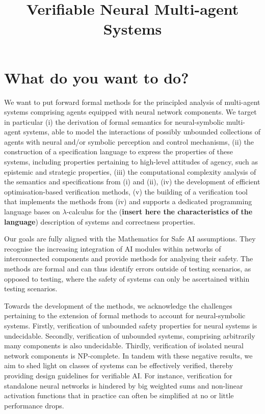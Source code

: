\documentclass{article}[11pt]
\title{Verifiable Neural Multi-agent Systems}
\date{}
\begin{document}
\maketitle

\section{What do you want to do?}


We want to put forward formal methods for the principled
analysis of multi-agent systems comprising agents equipped
with neural network components. We target in particular (i)
the derivation of formal semantics for neural-symbolic
multi-agent systems, able to model the interactions of
possibly unbounded collections of agents with neural and/or
symbolic perception and control mechanisms, (ii) the
construction of a specification language to express the
properties of these systems, including properties pertaining
to high-level attitudes of agency, such as epistemic and
strategic properties, (iii) the computational complexity
analysis of the semantics and specifications from (i) and
(ii), (iv) the development of efficient
optimisation-based verification methods, (v) the building of
a verification tool that implements the methods from (iv)
and supports a dedicated programming language bases on
$\lambda$-calculus for the ({\bf insert here the
characteristics of the language}) description of systems and
correctness properties.

Our goals are fully aligned with the Mathematics for Safe AI
assumptions.  They recognise the increasing integration of
AI modules within networks of interconnected components and
provide methods for analysing their safety.  The methods are
formal and  can thus identify errors outside of testing
scenarios, as opposed to testing, where the safety of
systems can only be ascertained within testing scenarios.

Towards the development of the methods, we acknowledge the
challenges pertaining to the extension of formal methods to account
for neural-symbolic systems. Firstly, verification of
unbounded safety properties for neural systems is
undecidable. Secondly, verification of unbounded systems,
comprising arbitrarily many components is also undecidable.
Thirdly, verification of isolated neural network components
is NP-complete. In tandem with these negative results, we
aim to shed light on classes of systems can be effectively
verified, thereby providing design guidelines for verifiable
AI. For instance, verification for standalone neural
networks is hindered by big weighted sums and non-linear
activation functions that in practice can often be
simplified at no or little performance drops. 
\end{document}
